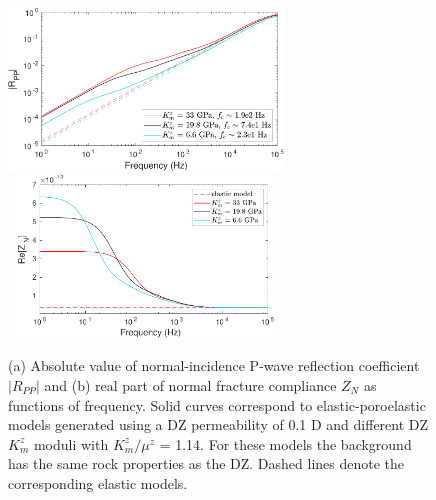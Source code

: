 \documentclass[draft]{agujournal2019}
\begin{document}
\begin{figure}
\centering
    \subcaptionbox{}
      {
       \includegraphics[width=73mm, height=43 mm]{figures/rt_dz_mod_perm1e-1d.pdf}
        }
    \subcaptionbox{}
      {
        \includegraphics[width=73mm, height=43mm]{figures/zn_dz_mod_perm1e-1d.pdf}
        }
\caption {(a) Absolute value of normal-incidence P-wave reflection coefficient $|R_{PP}|$ and (b) real part of normal fracture compliance $Z_N$ as functions of frequency.  Solid curves correspond to elastic-poroelastic models
generated using a DZ permeability of 0.1 D and different DZ  $K_m^z$ moduli with $K_m^z/\mu^z$ = 1.14. For these models the background has the same rock properties as the DZ. Dashed lines denote the corresponding elastic models. }
\label{fig:6}
\end{figure}
\end{document}
